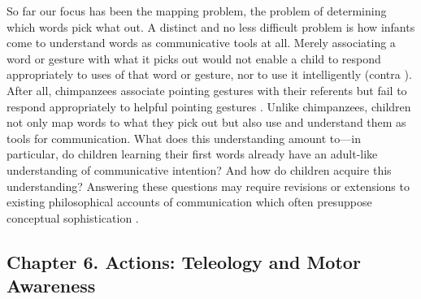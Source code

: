 \documentclass[12pt,\papersize]{extarticle}
\begin{document}
So far our focus has been the mapping problem, the problem of determining which words pick what out. 
A distinct and no less difficult problem is how infants come to understand words as communicative tools at all.
Merely associating a word or gesture with what it picks out would not enable a child to respond appropriately to uses of that word or gesture, nor to use it intelligently (contra \citealp[p.\ 75]{Russell:1921ww}).
After all, chimpanzees associate pointing gestures with their referents \citep[][p.\ 6]{Moll:2007gu} but fail to respond appropriately to helpful pointing gestures \citep{hare_chimpanzees_2004}. 
Unlike chimpanzees, children not only map words to what they pick out but also use and understand them as tools for communication. 
What does this understanding amount to---in particular, do children learning their first words already have an adult-like understanding of communicative intention?  And how do children acquire this understanding?
Answering these questions may require revisions or extensions to existing philosophical accounts of communication which often presuppose conceptual sophistication \citep[e.g.][]{Grice:1957kg}.




\subsection{Chapter 6. Actions: Teleology and Motor Awareness}
\end{document}
